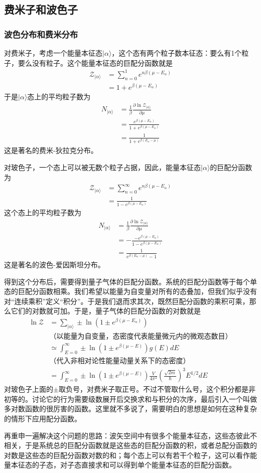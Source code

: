 \documentclass[a4paper,11pt]{ctexart}
\newcommand{\bea}{\begin{equation}\begin{aligned}}
\newcommand{\eea}{\end{aligned}\end{equation}}
\newcommand{\red}{\color{red}}
\newcommand{\grandz}{\mathcal{Z}}
\begin{document}
\subsection{费米子和波色子}
\subsubsection{波色分布和费米分布}
对费米子，考虑一个能量本征态$|\alpha \rangle$，这个态有两个粒子数本征态：要么有1个粒子，要么没有粒子。这个能量本征态的巨配分函数就是
\bea
\grandz_{|\alpha \rangle} &= \sum_{n=0}^1 e^{n\beta(\mu - E_\alpha)} \\
&= 1+ e^{\beta(\mu - E_\alpha)}
\eea
于是$|\alpha \rangle$态上的平均粒子数为
\bea
N_{|\alpha \rangle} &= \frac{1}{\beta} \frac{\partial \ln \grandz_{|\alpha \rangle}}{\partial \mu} \\
&=\frac{e^{\beta(\mu - E_\alpha)}}{1+e^{\beta(\mu - E_\alpha)}} \\
&= \frac{1}{1+e^{\beta(E_\alpha - \mu)}}
\eea
这是著名的{\red 费米-狄拉克分布}。
\par
对玻色子，一个态上可以被无数个粒子占据，因此，能量本征态$|\alpha \rangle$的巨配分函数为
\bea \label{bez}
\grandz_{|\alpha \rangle} &= \sum_{n=0}^\infty e^{n\beta(\mu - E_\alpha)} \\
&= \frac{1}{1- e^{\beta(\mu - E_\alpha)}}
\eea
这个态上的平均粒子数为
\bea
N_{|\alpha \rangle} &= \frac{1}{\beta} \frac{\partial \ln \grandz_{|\alpha \rangle}}{\partial \mu} \\
&=-\frac{-e^{\beta(\mu - E_\alpha)}}{1-e^{\beta(\mu - E_\alpha)}} \\
&= \frac{1}{ e^{\beta(E_\alpha - \mu)} - 1}
\eea
这是著名的{\red 波色-爱因斯坦分布}。
\par
得到这个分布后，需要得到量子气体的巨配分函数。系统的巨配分函数等于每个单态的巨配分函数相乘。我们希望以能量为自变量对所有的态叠加，但我们似乎没有对“连续乘积”定义“积分”。于是我们退而求其次，既然巨配分函数的乘积可乘，那么它们的对数就可加。于是，量子气体的巨配分函数的对数就是
\bea
\ln \grandz &= \sum_{|\alpha \rangle}\pm \ln (1 \pm e^{\beta(\mu - E_\alpha )}) \\
&\text{（以能量为自变量，态密度代表能量微元内的微观态数目）} \\
&\simeq \int_{E=0}^\infty \pm \ln (1 \pm e^{\beta(\mu - E)})g(E)dE \\
& \text{（代入非相对论性能量动量关系下的态密度）} \\
&=\int_{E=0}^\infty \pm \ln (1 \pm e^{\beta(\mu - E)})\frac{V}{4\pi^2} (\frac{\sqrt{2m}}{\hbar})^3 E^{1/2} dE
\eea
对玻色子上面的$\pm$取负号，对费米子取正号。不过不管取什么号，这个积分都是非初等的。讨论它的行为需要级数展开后交换求和与积分的次序，最后引入一个叫做多对数函数的很厉害的函数。这里就不多说了，需要明白的思想是如何在这种复杂的情形下应用配分函数。
\par
再重申一遍解决这个问题的思路：波矢空间中有很多个能量本征态，这些态彼此不相关，于是系统总的巨配分函数就是这些态的巨配分函数的积，或者总配分函数的对数是这些态的巨配分函数对数的和；每个态上可以有若干个粒子，这可以看作能量本征态的子态，对子态直接求和可以得到单个能量本征态的巨配分函数。
\end{document}

